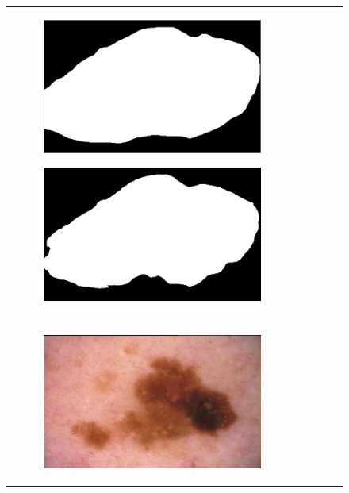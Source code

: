 \documentclass[a4paper, 10pt, conference]{ieeeconf}        %
\begin{document}
\begin{figure}[ht!]
\begin{tabular}{c c c c c}
\begin{subfigure}{0.2\textwidth}
        \end{subfigure} 
       \begin{subfigure}{0.2\textwidth}
        \includegraphics[scale=0.2]{expert_3GroundTrue_04.JPG}
        \end{subfigure} 
       \begin{subfigure}{0.2\textwidth}
        \includegraphics[scale=0.2]{finalGroundTrue_04.JPG}
        \end{subfigure} \\ \\
         \begin{subfigure}{0.2\textwidth}
         \includegraphics[scale=0.15]{original05.JPG}

\end{subfigure}
\end{tabular}
\end{figure}
\end{document}
